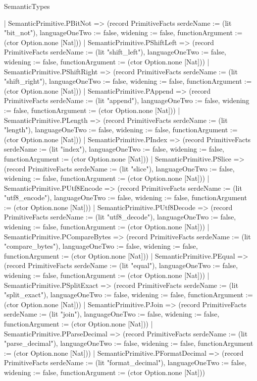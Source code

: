 \begin{lexlean}{SemanticTypes}
\begin{semanticmodule}
{    | SemanticPrimitive.PBitNot => (record PrimitiveFacts {serdeName := (lit "bit_not"), languageOneTwo := false, widening := false, functionArgument := (ctor Option.none [Nat])})
    | SemanticPrimitive.PShiftLeft => (record PrimitiveFacts {serdeName := (lit "shift_left"), languageOneTwo := false, widening := false, functionArgument := (ctor Option.none [Nat])})
    | SemanticPrimitive.PShiftRight => (record PrimitiveFacts {serdeName := (lit "shift_right"), languageOneTwo := false, widening := false, functionArgument := (ctor Option.none [Nat])})
    | SemanticPrimitive.PAppend => (record PrimitiveFacts {serdeName := (lit "append"), languageOneTwo := false, widening := false, functionArgument := (ctor Option.none [Nat])})
    | SemanticPrimitive.PLength => (record PrimitiveFacts {serdeName := (lit "length"), languageOneTwo := false, widening := false, functionArgument := (ctor Option.none [Nat])})
    | SemanticPrimitive.PIndex => (record PrimitiveFacts {serdeName := (lit "index"), languageOneTwo := false, widening := false, functionArgument := (ctor Option.none [Nat])})
    | SemanticPrimitive.PSlice => (record PrimitiveFacts {serdeName := (lit "slice"), languageOneTwo := false, widening := false, functionArgument := (ctor Option.none [Nat])})
    | SemanticPrimitive.PUtf8Encode => (record PrimitiveFacts {serdeName := (lit "utf8_encode"), languageOneTwo := false, widening := false, functionArgument := (ctor Option.none [Nat])})
    | SemanticPrimitive.PUtf8Decode => (record PrimitiveFacts {serdeName := (lit "utf8_decode"), languageOneTwo := false, widening := false, functionArgument := (ctor Option.none [Nat])})
    | SemanticPrimitive.PCompareBytes => (record PrimitiveFacts {serdeName := (lit "compare_bytes"), languageOneTwo := false, widening := false, functionArgument := (ctor Option.none [Nat])})
    | SemanticPrimitive.PEqual => (record PrimitiveFacts {serdeName := (lit "equal"), languageOneTwo := false, widening := false, functionArgument := (ctor Option.none [Nat])})
    | SemanticPrimitive.PSplitExact => (record PrimitiveFacts {serdeName := (lit "split_exact"), languageOneTwo := false, widening := false, functionArgument := (ctor Option.none [Nat])})
    | SemanticPrimitive.PJoin => (record PrimitiveFacts {serdeName := (lit "join"), languageOneTwo := false, widening := false, functionArgument := (ctor Option.none [Nat])})
    | SemanticPrimitive.PParseDecimal => (record PrimitiveFacts {serdeName := (lit "parse_decimal"), languageOneTwo := false, widening := false, functionArgument := (ctor Option.none [Nat])})
    | SemanticPrimitive.PFormatDecimal => (record PrimitiveFacts {serdeName := (lit "format_decimal"), languageOneTwo := false, widening := false, functionArgument := (ctor Option.none [Nat])})
}
\end{semanticmodule}
\end{lexlean}
